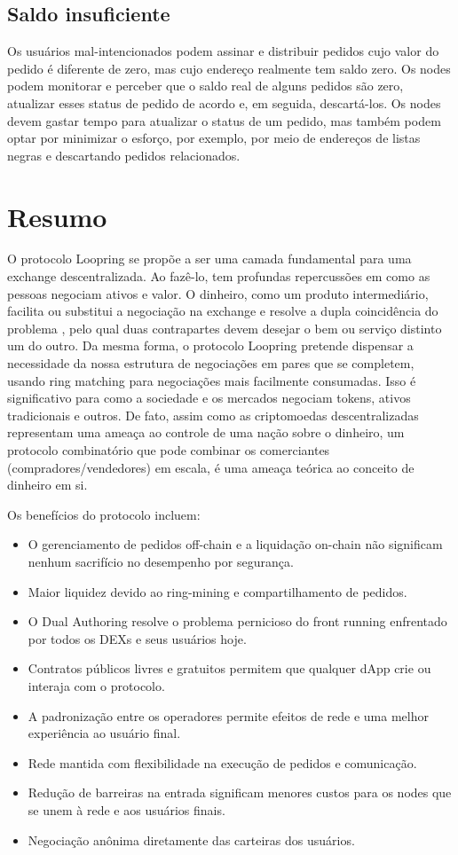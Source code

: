 \documentclass[UTF8,nofonts]{article}
\begin{document}
\begin{multicols}{2}
\subsection{Saldo insuficiente}
Os usuários mal-intencionados podem assinar e distribuir pedidos cujo valor do pedido é diferente de zero, mas cujo endereço realmente tem saldo zero. Os nodes podem monitorar e perceber que o saldo real de alguns pedidos são zero, atualizar esses status de pedido de acordo e, em seguida, descartá-los.
Os nodes devem gastar tempo para atualizar o status de um pedido, mas também podem optar por minimizar o esforço, por exemplo, por meio de endereços de listas negras e descartando pedidos relacionados.

\section{Resumo}

O protocolo Loopring se propõe a ser uma camada fundamental para uma exchange descentralizada. Ao fazê-lo, tem profundas repercussões em como as pessoas negociam ativos e valor. O dinheiro, como um produto intermediário, facilita ou substitui a negociação na exchange e resolve a dupla coincidência do problema \cite{unenumerated2006}, pelo qual duas contrapartes devem desejar o bem ou serviço distinto um do outro. Da mesma forma, o protocolo Loopring pretende dispensar a necessidade da nossa estrutura de negociações em pares que se completem, usando ring matching para negociações mais facilmente consumadas. Isso é significativo para como a sociedade e os mercados negociam tokens, ativos tradicionais e outros. De fato, assim como as criptomoedas descentralizadas representam uma ameaça ao controle de uma nação sobre o dinheiro, um protocolo combinatório que pode combinar os comerciantes (compradores/vendedores) em escala, é uma ameaça teórica ao conceito de dinheiro em si.

Os benefícios do protocolo incluem:

\begin{itemize}
	\item O gerenciamento de pedidos off-chain e a liquidação on-chain não significam nenhum sacrifício no desempenho por segurança.
	\item Maior liquidez devido ao ring-mining e compartilhamento de pedidos.
	\item O Dual Authoring resolve o problema pernicioso do front running enfrentado por todos os DEXs e seus usuários hoje.
	\item Contratos públicos livres e gratuitos permitem que qualquer dApp crie ou interaja com o protocolo.
	\item A padronização entre os operadores permite efeitos de rede e uma melhor experiência ao usuário final.
	\item Rede mantida com flexibilidade na execução de pedidos e comunicação.
	\item Redução de barreiras na entrada significam menores custos para os nodes que se unem à rede e aos usuários finais.
	\item Negociação anônima diretamente das carteiras dos usuários.
\end{itemize}


\end{multicols}
\end{document}
